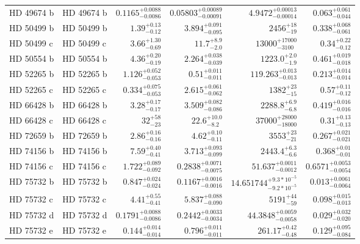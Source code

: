 \begin{longtable*}{llrrrr}
HD 49674 b & HD 49674 b & $0.1165^{+0.0088}_{-0.0086}$ & $0.05803^{+0.00089}_{-0.00091}$ & $4.9472^{+0.00013}_{-0.00014}$ & $0.063^{+0.061}_{-0.044}$ \\ 
HD 50499 b & HD 50499 b & $1.39^{+0.13}_{-0.12}$ & $3.894^{+0.091}_{-0.095}$ & $2456^{+18}_{-19}$ & $0.338^{+0.068}_{-0.061}$ \\ 
HD 50499 c & HD 50499 c & $3.66^{+1.30}_{-0.69}$ & $11.7^{+8.9}_{-2.0}$ & $13000^{+17000}_{-3100}$ & $0.34^{+0.22}_{-0.12}$ \\ 
HD 50554 b & HD 50554 b & $4.36^{+0.20}_{-0.19}$ & $2.264^{+0.038}_{-0.039}$ & $1223.0^{+2.0}_{-1.9}$ & $0.461^{+0.019}_{-0.018}$ \\ 
HD 52265 b & HD 52265 b & $1.126^{+0.052}_{-0.053}$ & $0.51^{+0.011}_{-0.011}$ & $119.263^{+0.013}_{-0.013}$ & $0.213^{+0.014}_{-0.014}$ \\ 
HD 52265 c & HD 52265 c & $0.334^{+0.075}_{-0.053}$ & $2.615^{+0.061}_{-0.062}$ & $1382^{+23}_{-15}$ & $0.57^{+0.11}_{-0.12}$ \\ 
HD 66428 b & HD 66428 b & $3.28^{+0.17}_{-0.17}$ & $3.509^{+0.082}_{-0.086}$ & $2288.8^{+6.9}_{-6.8}$ & $0.419^{+0.016}_{-0.016}$ \\ 
HD 66428 c & HD 66428 c & $32^{+58}_{-23}$ & $22.6^{+10.0}_{-8.2}$ & $37000^{+28000}_{-18000}$ & $0.31^{+0.13}_{-0.13}$ \\ 
HD 72659 b & HD 72659 b & $2.86^{+0.16}_{-0.16}$ & $4.62^{+0.10}_{-0.11}$ & $3553^{+23}_{-21}$ & $0.267^{+0.021}_{-0.021}$ \\ 
HD 74156 b & HD 74156 b & $7.59^{+0.40}_{-0.41}$ & $3.713^{+0.093}_{-0.099}$ & $2443.4^{+6.3}_{-6.6}$ & $0.368^{+0.01}_{-0.01}$ \\ 
HD 74156 c & HD 74156 c & $1.722^{+0.089}_{-0.092}$ & $0.2838^{+0.0071}_{-0.0075}$ & $51.637^{+0.0011}_{-0.0012}$ & $0.6571^{+0.0053}_{-0.0054}$ \\ 
HD 75732 b & HD 75732 b & $0.847^{+0.024}_{-0.024}$ & $0.1167^{+0.0016}_{-0.0016}$ & $14.651744^{+9.3*10^{-5}}_{-9.2*10^{-5}}$ & $0.013^{+0.0061}_{-0.0064}$ \\ 
HD 75732 c & HD 75732 c & $4.41^{+0.55}_{-0.41}$ & $5.837^{+0.088}_{-0.090}$ & $5191^{+44}_{-59}$ & $0.098^{+0.015}_{-0.013}$ \\ 
HD 75732 d & HD 75732 d & $0.1791^{+0.0088}_{-0.0086}$ & $0.2442^{+0.0033}_{-0.0034}$ & $44.3848^{+0.0059}_{-0.0058}$ & $0.029^{+0.032}_{-0.020}$ \\ 
HD 75732 e & HD 75732 e & $0.144^{+0.014}_{-0.014}$ & $0.796^{+0.011}_{-0.011}$ & $261.17^{+0.42}_{-0.48}$ & $0.129^{+0.095}_{-0.084}$ \\ 

\end{longtable*}
